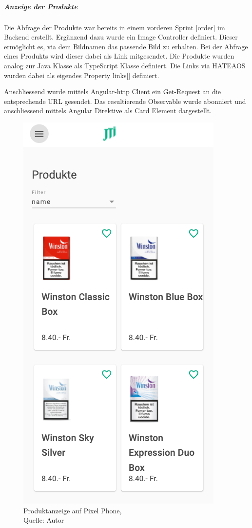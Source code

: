 \subparagraph{Anzeige der Produkte}
Die Abfrage der Produkte war bereits in einem vorderen Sprint \ref{order} im Backend erstellt. Ergänzend dazu wurde ein Image Controller definiert. Dieser ermöglicht es, via dem Bildnamen das passende Bild zu erhalten. Bei der Abfrage eines Produkts wird dieser dabei als Link mitgesendet. Die Produkte wurden analog zur Java Klasse als TypeScript Klasse definiert. Die Links via HATEAOS wurden dabei als eigendes Property links[] definiert. 

Anschliessend wurde mittels Angular-http Client ein Get-Request an die entsprechende URL gesendet. Das resultierende Observable wurde abonniert und anschliessend mittels Angular Direktive als Card Element dargestellt. 

\begin{figure}[h]
		\centering
		\includegraphics[scale=0.3]{images/productsPhone.PNG}
		\caption[Produktanzeige auf Pixel Phone]{Produktanzeige auf Pixel Phone,\\ Quelle: Autor}
		\label{img: Prodcuts pixel}
\end{figure}

